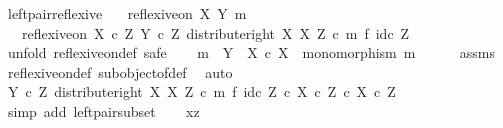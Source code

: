 \begin{isabellebody}
\ left{\isacharunderscore}{\kern0pt}pair{\isacharunderscore}{\kern0pt}reflexive{\isacharcolon}{\kern0pt}\isanewline
\ \ \ {\isachardoublequoteopen}reflexive{\isacharunderscore}{\kern0pt}on\ X\ {\isacharparenleft}{\kern0pt}Y{\isacharcomma}{\kern0pt}\ m{\isacharparenright}{\kern0pt}{\isachardoublequoteclose}\isanewline
\ \ \ {\isachardoublequoteopen}reflexive{\isacharunderscore}{\kern0pt}on\ {\isacharparenleft}{\kern0pt}X\ {\isasymtimes}\isactrlsub c\ Z{\isacharparenright}{\kern0pt}\ {\isacharparenleft}{\kern0pt}Y\ {\isasymtimes}\isactrlsub c\ Z{\isacharcomma}{\kern0pt}\ distribute{\isacharunderscore}{\kern0pt}right\ X\ X\ Z\ {\isasymcirc}\isactrlsub c\ {\isacharparenleft}{\kern0pt}m\ {\isasymtimes}\isactrlsub f\ id\isactrlsub c\ Z{\isacharparenright}{\kern0pt}{\isacharparenright}{\kern0pt}{\isachardoublequoteclose}\isanewline
%
\isadelimproof
%
\endisadelimproof
%
\isatagproof
{}\isamarkupfalse%
\ {\isacharparenleft}{\kern0pt}unfold\ reflexive{\isacharunderscore}{\kern0pt}on{\isacharunderscore}{\kern0pt}def{\isacharcomma}{\kern0pt}\ safe{\isacharparenright}{\kern0pt}\isanewline
\ \ \isamarkupfalse%
\ {\isachardoublequoteopen}m\ {\isacharcolon}{\kern0pt}\ Y\ {\isasymrightarrow}\ X\ {\isasymtimes}\isactrlsub c\ X\ {\isasymand}\ monomorphism\ m{\isachardoublequoteclose}\isanewline
\ \ \ \ \isamarkupfalse%
\ assms\ \isamarkupfalse%
\ reflexive{\isacharunderscore}{\kern0pt}on{\isacharunderscore}{\kern0pt}def\ subobject{\isacharunderscore}{\kern0pt}of{\isacharunderscore}{\kern0pt}def{}\ \isamarkupfalse%
\ auto\isanewline
\ \ \isamarkupfalse%
\ \isamarkupfalse%
\ {\isachardoublequoteopen}{\isacharparenleft}{\kern0pt}Y\ {\isasymtimes}\isactrlsub c\ Z{\isacharcomma}{\kern0pt}\ distribute{\isacharunderscore}{\kern0pt}right\ X\ X\ Z\ {\isasymcirc}\isactrlsub c\ m\ {\isasymtimes}\isactrlsub f\ id\isactrlsub c\ Z{\isacharparenright}{\kern0pt}\ {\isasymsubseteq}\isactrlsub c\ {\isacharparenleft}{\kern0pt}X\ {\isasymtimes}\isactrlsub c\ Z{\isacharparenright}{\kern0pt}\ {\isasymtimes}\isactrlsub c\ X\ {\isasymtimes}\isactrlsub c\ Z{\isachardoublequoteclose}\isanewline
\ \ \ \ \isamarkupfalse%
\ {\isacharparenleft}{\kern0pt}simp\ add{\isacharcolon}{\kern0pt}\ left{\isacharunderscore}{\kern0pt}pair{\isacharunderscore}{\kern0pt}subset{\isacharparenright}{\kern0pt}\isanewline
{}\isamarkupfalse%
\isanewline
\ \ \isamarkupfalse%
\ xz\isanewline
\ \ \isamarkupfalse%

\end{isabellebody}
